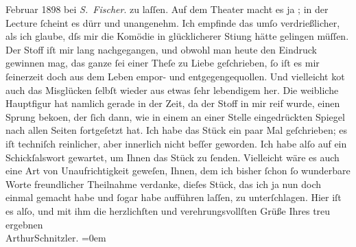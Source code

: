 \begin{ledgroupsized}[t]{13cm}
{{{                            Februar 1898 bei \emph{S. Fischer}.}}}\label{K_L00636_1h} zu laſſen. Auf dem Theater macht es ja
                        \label{K_L00636_2v}\label{K_L00636_2h}; in der Lecture ſcheint es dürr
                    und unangenehm. Ich empfinde das umſo verdrießlicher, als ich glaube, dſs mir
                    die Komödie in glücklicherer Sti{\geminationm}ung hätte gelingen
                    müſſen. {\pb}Der Stoff iſt mir lang
                    nachgegangen, und obwohl man heute den Eindruck gewinnen mag, das ganze ſei
                    einer Theſe zu Liebe geſchrieben, ſo iſt es mir ſeinerzeit doch aus dem Leben
                    empor- und entgegengequollen. Und vielleicht ko{\geminationm}t
                    auch das Misglücken ſelbſt wieder aus etwas ſehr lebendigem {\pb}her. Die weibliche Hauptfigur hat
                    namlich gerade in der Zeit, da der Stoff in mir reif wurde, einen Sprung beko{\geminationm}en, der ſich dann, wie in einem an einer Stelle
                    eingedrückten Spiegel nach allen Seiten fortgeſetzt hat. Ich habe das Stück ein paar Mal geſchrieben; es iſt
                    techniſch reinlicher, aber innerlich {\pb}nicht beſſer geworden. Ich habe alſo auf ein Schickſalswort gewartet, um Ihnen
                    das Stück zu ſenden. Vielleicht wäre es auch eine Art von Unaufrichtigkeit
                    geweſen, Ihnen, dem ich bisher ſchon ſo wunderbare Worte freundlicher Theilnahme
                    verdanke, dieſes Stück, das ich ja nun doch einmal {\pb}gemacht habe und ſogar habe aufführen
                    laſſen, zu unterſchlagen.\pend
           \pstart
           Hier iſt es alſo, und mit ihm die
                    herzlichſten und verehrungsvollſten Grüße Ihres treu ergebnen{\\[\baselineskip]}\spacefill\mbox{ArthurSchnitzler.}\pend
           \leftskip=0em{}
         
         \endnumbering{}\end{ledgroupsized}  \newcommand{\dateiname}{L00636}\newcommand{\titel}{Arthur Schnitzler an Georg Brandes, 11. 1. 1897}\newcommand{\editorInnen}{Martin Anton Müller und Gerd-Hermann Susen}
      